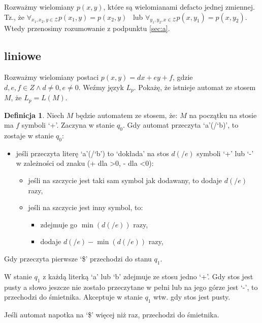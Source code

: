 \documentclass{article}
\theoremstyle{definition}
\newtheorem{definition}{Definicja}[section]
\theoremstyle{remark}
\begin{document}
Rozważmy wielomiany \(p(x,y)\), które są wielomianami defacto jednej zmiennej. Tz., że
\(\forall_{x_1,x_2,y \in \mathcal{Z}} p(x_1,y)=p(x_2,y)\) \ 
lub \(\forall_{y_1,y_2,x \in \mathcal{Z}} p(x,y_1)=p(x,y_2)\). Wtedy przenosimy rozumowanie z podpunktu \ref{sec:a}.

\subsection{liniowe}
Rozważmy wielomiany postaci \(p(x,y)=dx + ey + f\), gdzie \(d,e,f \in Z \land d \neq 0, e \neq 0\).
Weźmy język \(L_p\). Pokażę, że istnieje automat ze stosem \(M\),
że \(L_p = L(M)\).

\begin{definition}
    Niech \(M\) będzie automatem ze stosem, że:
    \(M\) na początku na stosie ma \(f\) symboli `+'.
    Zaczyna w stanie \(q_0\).
    Gdy automat przeczyta `a'(/`b)', to zostaje w stanie \(q_0\):
    \begin{itemize}
        \item jeśli przeczyta literę `a'(/`b') to `dokłada' na stos \(d(/e)\) symboli `+' lub `-' w zależności od znaku (+ dla >0, - dla <0):
        \begin{itemize}
            \item jeśli na szczycie jest taki sam symbol jak dodawany, to dodaje \(d(/e)\) razy,
            \item jeśli na szczycie jest inny symbol, to:
            \begin{itemize}
                \item zdejmuje go \(\min(d(/e))\) razy,
                \item dodaje \(d(/e) - \min(d(/e))\) razy,
            \end{itemize}
        \end{itemize}
    \end{itemize}

    Gdy przeczyta pierwsze `\$' przechodzi do stanu \(q_1\).

    W stanie \(q_1\) z każdą literką `a' lub `b' zdejmuje ze stosu jedno `+'.
    Gdy stos jest pusty a słowo jeszcze nie zostało przeczytane w pełni lub na jego górze jest `-',
    to przechodzi do śmietnika.
    Akceptuje w stanie \(q_1\) wtw. gdy stos jest pusty.

    Jeśli automat napotka na `\$' więcej niż raz, przechodzi do śmietnika.
\end{definition}
\end{document}
